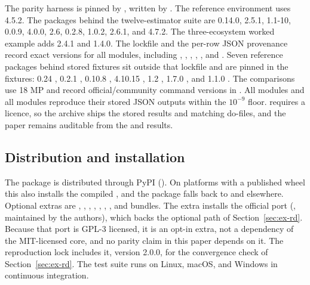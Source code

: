 The  parity harness is pinned by
, written by 
\citep{ushey2026renv}. The reference environment uses
 4.5.2. The packages behind the twelve-estimator suite are
 0.14.0,  2.5.1,
 1.1-10,  0.0.9,  4.0.0,
 2.6,  0.2.8,  1.0.2,
 2.6.1, and  4.7.2. The three-ecosystem worked
example adds  2.4.1 and  1.4.0. The lockfile
and the per-row JSON provenance record exact versions for all
\RParityModuleCount{} modules, including , ,
 \citep{bates2015lme4}, 
\citep{koenker2025quantreg},  \citep{butts2022stage}, and
 \citep{cattaneo2020analysis}. Seven reference packages behind
stored fixtures sit outside that lockfile and are pinned in the fixtures:
 0.24 \citep{imai2014covariate},  0.2.1
\citep{hainmueller2012entropy},  0.10.8
\citep{hansen2006optimal},  4.10.15
\citep{sekhon2011multivariate},  1.2 \citep{wang2020minimal},
 1.7.0 \citep{greifer2026weightit}, and  1.1.0
\citep{kolesar2022shiftsharese}. The  comparisons use  18 MP and record
official/community command versions in
. All \StataParityModuleCount{} 
modules and all \RParityModuleCount{}  modules reproduce their stored
JSON outputs within the \(10^{-9}\) floor.  requires a licence,
so the archive ships the stored results and matching do-files, and the paper
remains auditable from the  and  results.

\subsection{Distribution and installation}\label{sec:install}

The package is distributed through PyPI
(). On platforms with a
published wheel this also installs the compiled , and the
package falls back to  and  elsewhere. Optional extras are
, , , ,
, , , and 
bundles. The  extra installs the official 
 port (, maintained by the
 authors), which backs the optional 
path of Section~\ref{sec:ex-rd}. Because that port is GPL-3 licensed, it is an
opt-in extra, not a dependency of the MIT-licensed core, and no parity claim in
this paper depends on it. The reproduction lock includes it, version 2.0.0, for
the convergence check of Section~\ref{sec:ex-rd}. The test suite runs on Linux, macOS, and Windows in
continuous integration.

